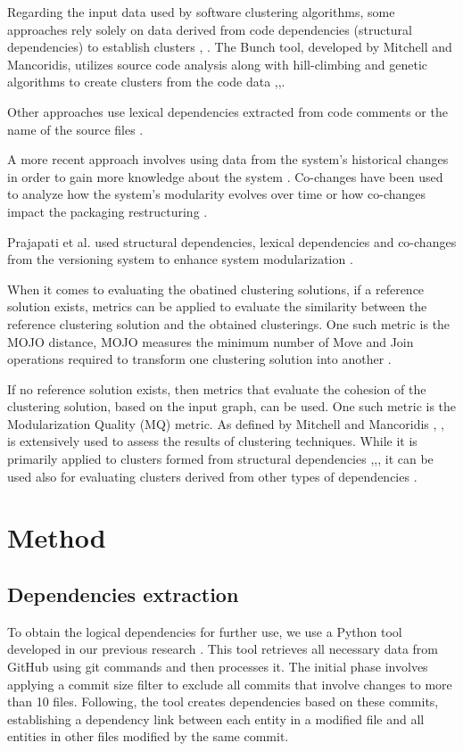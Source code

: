 \documentclass[conference]{IEEEtran}
\begin{document}
Regarding the input data used by software clustering algorithms, some approaches rely solely on data derived from code dependencies (structural dependencies) to establish clusters \cite{SoraSem13}, \cite{891477}. The Bunch tool, developed by Mitchell and Mancoridis, utilizes source code analysis along with hill-climbing and genetic algorithms to create clusters from the code data \cite{Bunch1},\cite{Bunch2},\cite{Bunch3}.

Other approaches use lexical dependencies extracted from code comments \cite{5741257} or the name of the source files \cite{Anquetil1999RecoveringSA} \cite{Anquetil1998RecoveringSA}. 

A more recent approach involves using data from the system's historical changes in order to gain more knowledge about the system \cite{article-cochangem}. Co-changes have been used to analyze how the system's modularity evolves over time \cite{10.1145/3196398.3196409} or how co-changes impact the packaging restructuring \cite{clusters-cochange}.

Prajapati et al. used structural dependencies, lexical dependencies and co-changes from the versioning system to enhance system modularization \cite{clustering-ld-lexical}.

When it comes to evaluating the obatined clustering solutions,  if a reference solution exists, metrics can be applied to evaluate the similarity between the reference clustering solution and the obtained clusterings. One such metric is the MOJO distance, MOJO measures the minimum number of Move and Join operations required to transform one clustering solution into another \cite{mojo-tzerpos}. 


If no reference solution exists, then metrics that evaluate the cohesion of the clustering solution, based on the input graph, can be used. One such metric is the Modularization Quality (MQ) metric. As defined by Mitchell and Mancoridis \cite{mqmetric}, \cite{mqmetric2}, is extensively used to assess the results of clustering techniques. While it is primarily applied to clusters formed from structural dependencies \cite{Bunch1},\cite{Bunch2},\cite{Bunch3}, it can be used also for evaluating clusters derived from other types of dependencies \cite{clustering-ld-lexical}.


\section{Method}
\label{method}

\subsection{Dependencies extraction}
To obtain the logical dependencies for further use, we use a Python tool developed in our previous research \cite{articlekeyclass23}. This tool retrieves all necessary data from GitHub \cite{ApacheAntGitHub} using git commands and then processes it. 
The initial phase involves applying a commit size filter to exclude all commits that involve changes to more than 10 files. Following, the tool creates dependencies based on these commits, establishing a dependency link between each entity in a modified file and all entities in other files modified by the same commit. 
\end{document}

